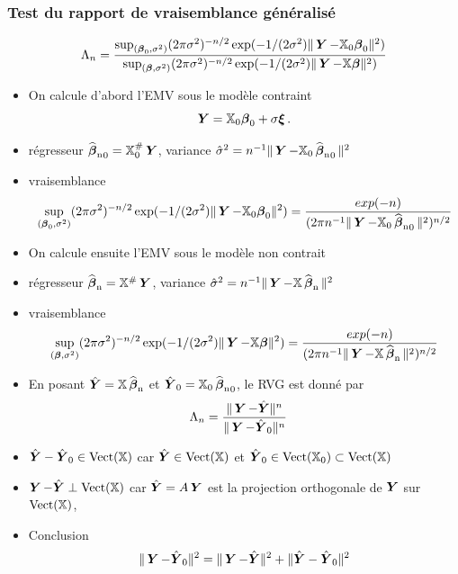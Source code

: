 \begin{frame}
\frametitle{Test du rapport de vraisemblance généralisé}
\[
\Lambda_n = \frac{\sup_{(\truebeta_0,\sigma^2)} (2 \pi \sigma^2)^{-n/2} \exp(-1/(2\sigma^2) \| \bY - \regressmat_0 \truebeta_0\|^2)}{\sup_{(\truebeta,\sigma^2)} (2 \pi \sigma^2)^{-n/2} \exp(-1/(2\sigma^2) \| \bY - \regressmat \truebeta\|^2)}
\]
{
\begin{itemize}
\item On calcule d'abord l'EMV sous le modèle contraint
\[
\bY = \regressmat_0 \truebeta_0 + \sigma \bnoise \eqsp.
\]
\item \alert{régresseur} $\estregress_0= \regressmat_0^{\#} \bY$, \alert{variance} $\hat{\sigma}^2= n^{-1} \| \bY - \regressmat_0 \estregress_0\|^2$
\item \alert{vraisemblance}
\[
\sup_{(\truebeta_0,\sigma^2)} (2 \pi \sigma^2)^{-n/2} \exp(-1/(2\sigma^2) \| \bY - \regressmat_0 \truebeta_0\|^2)
= \frac{exp(-n)}{(2 \pi n^{-1} \| \bY - \regressmat_0 \estregress_0\|^2)^{n/2}}
\]
\end{itemize}
}
{
\begin{itemize}
\item On calcule ensuite l'EMV sous le modèle non contrait
\item \alert{régresseur} $\estregress= \regressmat^{\#} \bY$, \alert{variance} $\hat{\sigma}^2= n^{-1} \| \bY - \regressmat \estregress\|^2$
\item \alert{vraisemblance}
\[
\sup_{(\truebeta,\sigma^2)} (2 \pi \sigma^2)^{-n/2} \exp(-1/(2\sigma^2) \| \bY - \regressmat \truebeta\|^2)
= \frac{exp(-n)}{(2 \pi n^{-1} \| \bY - \regressmat \estregress \|^2)^{n/2}}
\]
\end{itemize}
}
{
\begin{itemize}
\item En posant $\predY= \regressmat \estregress$ et $\predY_0= \regressmat_0 \estregress_0$, le RVG est donné par
\begin{align*}
\Lambda_n &= \frac{\| \bY - \predY \|^n}{\| \bY - \predY_0 \|^n}
\end{align*}
\item $\predY - \predY_0 \in \vect(\regressmat)$ car $\predY \in \vect(\regressmat)$ et $\predY_0 \in \vect(\regressmat_0) \subset \vect(\regressmat)$
\item $\bY - \predY \perp \vect(\regressmat)$ car $\predY= \projX \bY$ est la projection orthogonale de $\bY$ sur $\vect(\regressmat)$,
\item \alert{Conclusion}
\[
\| \bY - \predY_0 \|^2 = \|\bY - \predY \|^2 + \| \predY - \predY_0 \|^2
\]
\end{itemize}
}
\end{frame}

